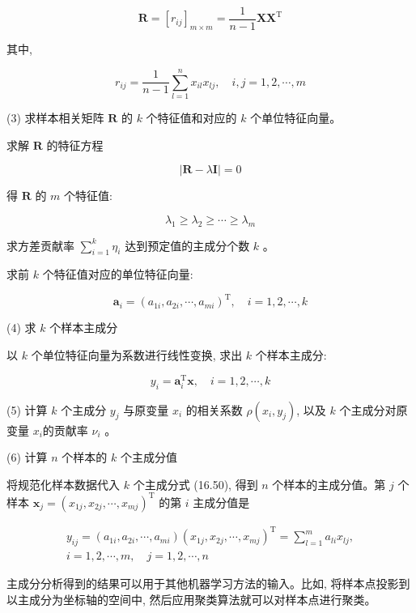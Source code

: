 \documentclass[10pt]{article}
\begin{document}
$$
\boldsymbol{R}=\left[r_{i j}\right]_{m \times m}=\frac{1}{n-1} \boldsymbol{X} \boldsymbol{X}^{\mathrm{T}}
$$

其中,

$$
r_{i j}=\frac{1}{n-1} \sum_{l=1}^{n} x_{i l} x_{l j}, \quad i, j=1,2, \cdots, m
$$

(3) 求样本相关矩阵 $\boldsymbol{R}$ 的 $k$ 个特征值和对应的 $k$ 个单位特征向量。

求解 $\boldsymbol{R}$ 的特征方程

$$
|\boldsymbol{R}-\lambda \boldsymbol{I}|=0
$$

得 $\boldsymbol{R}$ 的 $m$ 个特征值:

$$
\lambda_{1} \geqslant \lambda_{2} \geqslant \cdots \geqslant \lambda_{m}
$$

求方差贡献率 $\sum_{i=1}^{k} \eta_{i}$ 达到预定值的主成分个数 $k$ 。

求前 $k$ 个特征值对应的单位特征向量:

$$
\boldsymbol{a}_{i}=\left(a_{1 i}, a_{2 i}, \cdots, a_{m i}\right)^{\mathrm{T}}, \quad i=1,2, \cdots, k
$$

(4) 求 $k$ 个样本主成分

以 $k$ 个单位特征向量为系数进行线性变换, 求出 $k$ 个样本主成分:


\begin{equation*}
y_{i}=\boldsymbol{a}_{i}^{\mathrm{T}} \boldsymbol{x}, \quad i=1,2, \cdots, k \tag{16.50}
\end{equation*}


(5) 计算 $k$ 个主成分 $y_{j}$ 与原变量 $x_{i}$ 的相关系数 $\rho\left(x_{i}, y_{j}\right)$, 以及 $k$ 个主成分对原变量 $x_{i}$的贡献率 $\nu_{i}$ 。

(6) 计算 $n$ 个样本的 $k$ 个主成分值

将规范化样本数据代入 $k$ 个主成分式 (16.50), 得到 $n$ 个样本的主成分值。第 $j$ 个样本 $\boldsymbol{x}_{j}=\left(x_{1 j}, x_{2 j}, \cdots, x_{m j}\right)^{\mathrm{T}}$ 的第 $i$ 主成分值是

$$
\begin{gathered}
y_{i j}=\left(a_{1 i}, a_{2 i}, \cdots, a_{m i}\right)\left(x_{1 j}, x_{2 j}, \cdots, x_{m j}\right)^{\mathrm{T}}=\sum_{l=1}^{m} a_{l i} x_{l j}, \\
i=1,2, \cdots, m, \quad j=1,2, \cdots, n
\end{gathered}
$$

主成分分析得到的结果可以用于其他机器学习方法的输入。比如, 将样本点投影到以主成分为坐标轴的空间中, 然后应用聚类算法就可以对样本点进行聚类。
\end{document}

